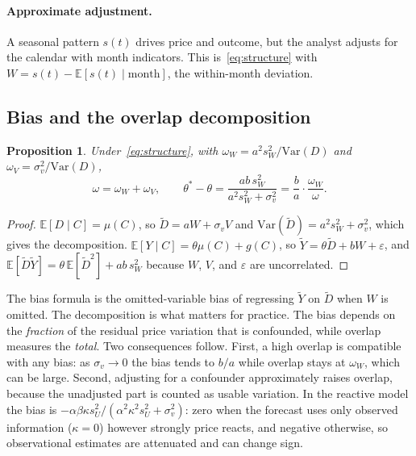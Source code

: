 \documentclass[11pt]{article}
\newtheorem{proposition}{Proposition}
\theoremstyle{remark}
\newcommand{\E}{\mathbb{E}}
\newcommand{\Var}{\mathrm{Var}}
\begin{document}
\paragraph{Approximate adjustment.} A seasonal pattern $s(t)$ drives price and outcome, but the analyst adjusts for the calendar with month indicators. This is~\eqref{eq:structure} with $W = s(t) - \E[s(t) \mid \text{month}]$, the within-month deviation.

\subsection{Bias and the overlap decomposition}

\begin{proposition}
\label{prop:bias}
Under~\eqref{eq:structure}, with $\omega_W = a^2 s_W^2 / \Var(D)$ and $\omega_V = \sigma_v^2 / \Var(D)$,
\begin{equation}
\omega = \omega_W + \omega_V, \qquad
\theta^\ast - \theta = \frac{ab\,s_W^2}{a^2 s_W^2 + \sigma_v^2} = \frac{b}{a} \cdot \frac{\omega_W}{\omega}.
\label{eq:bias}
\end{equation}
\end{proposition}

\begin{proof}
$\E[D \mid C] = \mu(C)$, so $\tilde D = aW + \sigma_v V$ and $\Var(\tilde D) = a^2 s_W^2 + \sigma_v^2$, which gives the decomposition. $\E[Y \mid C] = \theta\mu(C) + g(C)$, so $\tilde Y = \theta \tilde D + bW + \varepsilon$, and $\E[\tilde D \tilde Y] = \theta\,\E[\tilde D^2] + ab\,s_W^2$ because $W$, $V$, and $\varepsilon$ are uncorrelated.
\end{proof}

The bias formula is the omitted-variable bias of regressing $\tilde Y$ on $\tilde D$ when $W$ is omitted. The decomposition is what matters for practice. The bias depends on the \emph{fraction} of the residual price variation that is confounded, while overlap measures the \emph{total}. Two consequences follow. First, a high overlap is compatible with any bias: as $\sigma_v \to 0$ the bias tends to $b/a$ while overlap stays at $\omega_W$, which can be large. Second, adjusting for a confounder approximately raises overlap, because the unadjusted part is counted as usable variation. In the reactive model the bias is $-\alpha\beta\kappa s_U^2 / (\alpha^2\kappa^2 s_U^2 + \sigma_v^2)$: zero when the forecast uses only observed information ($\kappa = 0$) however strongly price reacts, and negative otherwise, so observational estimates are attenuated and can change sign.
\end{document}
